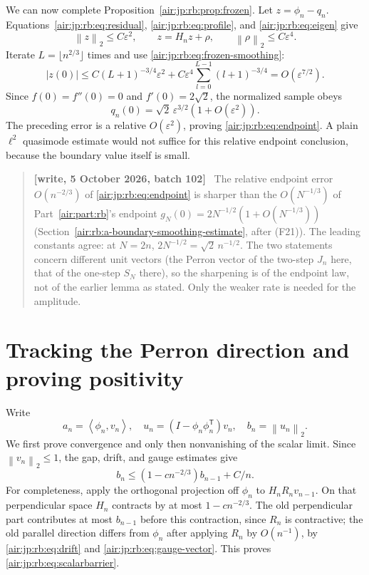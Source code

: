 \documentclass[11pt,letterpaper]{article}
\numberwithin{equation}{section}
\theoremstyle{remark}
\newcommand{\norm}[1]{\left\lVert#1\right\rVert}
\newcommand{\ip}[2]{\left\langle#1,#2\right\rangle}
\newcommand{\eps}{\varepsilon}
\newenvironment{writenotejp}{\par\smallskip\begin{quote}\small\textbf{[write, 5 October 2026, batch 102]}\ }{\end{quote}\smallskip}
\begin{document}
We can now complete Proposition~\ref{air:jp:rb:prop:frozen}. Let $z=\phi_n-q_n$. Equations~\eqref{air:jp:rb:eq:residual}, \eqref{air:jp:rb:eq:profile}, and \eqref{air:jp:rb:eq:eigen} give
\[
 \norm z_2\le C\eps^2,\qquad z=H_nz+\rho,\qquad \norm\rho_2\le C\eps^4.
\]
Iterate $L=\lfloor n^{2/3}\rfloor$ times and use \eqref{air:jp:rb:eq:frozen-smoothing}:
\[
 |z(0)|\le C(L+1)^{-3/4}\eps^2
       +C\eps^4\sum_{l=0}^{L-1}(l+1)^{-3/4}
       =O(\eps^{7/2}).
\]
Since $f(0)=f''(0)=0$ and $f'(0)=2\sqrt2$, the normalized sample obeys
\[
 q_n(0)=\sqrt2\,\eps^{3/2}(1+O(\eps^2)).
\]
The preceding error is a relative $O(\eps^2)$, proving \eqref{air:jp:rb:eq:endpoint}. A plain $\ell^2$ quasimode estimate would not suffice for this relative endpoint conclusion, because the boundary value itself is small.
\begin{writenotejp}
The relative endpoint error $O(n^{-2/3})$ of \eqref{air:jp:rb:eq:endpoint} is sharper than the $O(N^{-1/3})$ of Part~\ref{air:part:rb}'s endpoint $g_N(0)=2N^{-1/2}(1+O(N^{-1/3}))$ (Section~\ref{air:rb:a-boundary-smoothing-estimate}, after (F21)). The leading constants agree: at $N=2n$, $2N^{-1/2}=\sqrt2\,n^{-1/2}$. The two statements concern different unit vectors (the Perron vector of the two-step $J_n$ here, that of the one-step $S_N$ there), so the sharpening is of the endpoint law, not of the earlier lemma as stated. Only the weaker rate is needed for the amplitude.
\end{writenotejp}

\section{Tracking the Perron direction and proving positivity}\label{air:jp:rb:sec:tracking}

Write
\[
 a_n=\ip{\phi_n}{v_n},\quad
 u_n=(I-\phi_n\phi_n^{\mathsf T})v_n,\quad b_n=\norm{u_n}_2.
\]
We first prove convergence and only then nonvanishing of the scalar limit. Since $\norm{v_n}_2\le1$, the gap, drift, and gauge estimates give
\begin{equation}\label{air:jp:rb:eq:scalarbarrier}
 b_n\le(1-cn^{-2/3})b_{n-1}+C/n.
\end{equation}
For completeness, apply the orthogonal projection off $\phi_n$ to $H_nR_nv_{n-1}$. On that perpendicular space $H_n$ contracts by at most $1-cn^{-2/3}$. The old perpendicular part contributes at most $b_{n-1}$ before this contraction, since $R_n$ is contractive; the old parallel direction differs from $\phi_n$ after applying $R_n$ by $O(n^{-1})$, by \eqref{air:jp:rb:eq:drift} and \eqref{air:jp:rb:eq:gauge-vector}. This proves \eqref{air:jp:rb:eq:scalarbarrier}.
\end{document}
